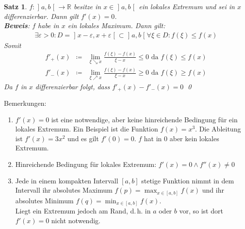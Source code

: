 \documentclass[ngerman,titlepage,twoside, parskip=half*]{scrreprt}
\newcommand*{\R}{\mathbb{R}}
\theoremstyle{break}
\newtheorem{theorem}{Satz}[section]
\theoremstyle{nonumberbreak}
\newcommand*{\bsofint}[1]{\mathopen{]}#1\mathclose{[}} %
\begin{document}
\begin{theorem}
  \label{satz:lokExtremum}
  $f\colon\bsofint{a,b}\rightarrow\R$ besitze in $x\in \bsofint{a,b}$ ein lokales Extremum
  und sei in $x$ differenzierbar. Dann gilt $f'(x)=0$.\\
  \textbf{Beweis}: $f$ habe in $x$ ein lokales Maximum. Dann gilt:
  \begin{gather*}\exists\varepsilon>0\colon D=\bsofint{x-\varepsilon,x+\varepsilon}\subset\bsofint{a,b}
  \forall\xi\in D\colon f(\xi)\leq f(x)\end{gather*}
  Somit
  \begin{align*}
    f'_+(x) & \coloneqq & \lim_{\xi\searrow x}\frac{f(\xi)-f(x)}{\xi-x}\leq 0 \text{ da } f(\xi)\leq f(x)\\
    f'_-(x) & \coloneqq & \lim_{\xi\nearrow x}\frac{f(\xi)-f(x)}{\xi-x}\geq 0 \text{ da } f(\xi)\geq f(x)
  \end{align*}
  Da $f$ in $x$ differenzierbar folgt, dass $f'_+(x)-f'_-(x)=0$
  \qed
\end{theorem}

Bemerkungen:
\begin{enumerate}[(1)]
  \item $f'(x)=0$ ist eine notwendige, aber keine hinreichende 
    Bedingung für ein lokales Extremum. Ein Beispiel ist die Funktion
    $f(x)=x^3$. Die Ableitung ist $f'(x)=3x^2$ und es gilt $f'(0)=0$.
    $f$ hat in 0 aber kein lokales Extremum.
  \item Hinreichende Bedingung für lokales Extremum: $f'(x)=0\wedge f''(x)\neq 0$
  \item Jede in einem kompakten Intervall $[a,b]$ stetige Funktion nimmt
    in dem Intervall ihr absolutes Maximum $f(p)=\max_{x\in[a,b]}f(x)$
    und ihr absolutes Minimum $f(q)=\min_{x\in[a,b]}f(x)$.\\
    Liegt ein Extremum jedoch am Rand, d.\,h. in $a$ oder $b$ vor, so ist
    dort $f'(x)=0$ nicht notwendig.
\end{enumerate}
\end{document}
